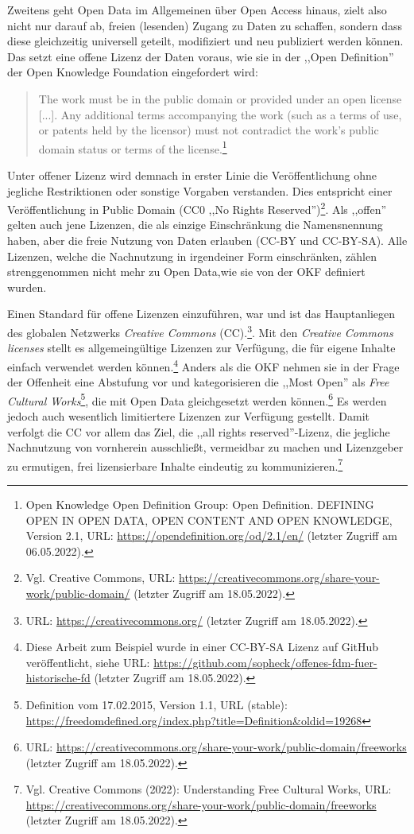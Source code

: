 Zweitens geht Open Data im Allgemeinen über Open Access hinaus, zielt also nicht nur darauf ab, freien (lesenden) Zugang zu Daten zu schaffen, sondern dass diese gleichzeitig universell geteilt, modifiziert und neu publiziert werden können. Das setzt eine offene Lizenz der Daten voraus, wie sie in der ,,Open Definition'' der Open Knowledge Foundation eingefordert wird:

\begin{quote}
The work must be in the public domain or provided under an open license [...]. Any additional terms accompanying the work (such as a terms of use, or patents held by the licensor) must not contradict the work’s public domain status or terms of the license.\footnote{Open Knowledge Open Definition Group: Open Definition. DEFINING OPEN IN OPEN DATA, OPEN CONTENT AND OPEN KNOWLEDGE, Version 2.1, URL: \url{https://opendefinition.org/od/2.1/en/} (letzter Zugriff am 06.05.2022).}
\end{quote}

Unter offener Lizenz wird demnach in erster Linie die Veröffentlichung ohne jegliche Restriktionen oder sonstige Vorgaben verstanden. Dies entspricht einer Veröffentlichung in Public Domain (CC0 ,,No Rights Reserved'')\footnote{Vgl. Creative Commons, URL: \url{https://creativecommons.org/share-your-work/public-domain/} (letzter Zugriff am 18.05.2022).}. Als ,,offen'' gelten auch jene Lizenzen, die als einzige Einschränkung die Namensnennung haben, aber die freie Nutzung von Daten erlauben (CC-BY und CC-BY-SA). Alle Lizenzen, welche die Nachnutzung in irgendeiner Form einschränken, zählen strenggenommen nicht mehr zu Open Data,wie sie von der OKF definiert wurden. 

Einen Standard für offene Lizenzen einzuführen, war und ist das Hauptanliegen des globalen Netzwerks \textit{Creative Commons} (CC).\footnote{URL: \url{https://creativecommons.org/} (letzter Zugriff am 18.05.2022).}. Mit den \textit{Creative Commons licenses} stellt es allgemeingültige Lizenzen zur Verfügung, die für eigene Inhalte einfach verwendet werden können.\footnote{Diese Arbeit zum Beispiel wurde in einer CC-BY-SA Lizenz auf GitHub veröffentlicht, siehe URL: \url{https://github.com/sopheck/offenes-fdm-fuer-historische-fd} (letzter Zugriff am 18.05.2022).} Anders als die OKF nehmen sie in der Frage der Offenheit eine Abstufung vor und kategorisieren die ,,Most Open'' als \textit{Free Cultural Works}\footnote{Definition vom 17.02.2015, Version 1.1, URL (stable): \url{https://freedomdefined.org/index.php?title=Definition&oldid=19268} }, die mit Open Data gleichgesetzt werden können.\footnote{URL: \url{https://creativecommons.org/share-your-work/public-domain/freeworks} (letzter Zugriff am 18.05.2022).} Es werden jedoch auch wesentlich limitiertere Lizenzen zur Verfügung gestellt. Damit verfolgt die CC vor allem das Ziel, die ,,all rights reserved''-Lizenz, die jegliche  Nachnutzung von vornherein ausschließt, vermeidbar zu machen und Lizenzgeber zu ermutigen, frei lizensierbare Inhalte eindeutig zu kommunizieren.\footnote{Vgl. Creative Commons (2022): Understanding Free Cultural Works, URL: \url{https://creativecommons.org/share-your-work/public-domain/freeworks} (letzter Zugriff am 18.05.2022).}

